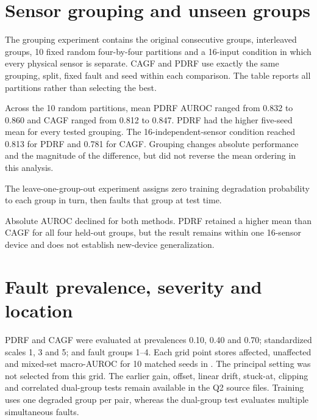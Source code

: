 \documentclass[10pt]{article}
\begin{document}
\section{Sensor grouping and unseen groups}

The grouping experiment contains the original consecutive groups, interleaved groups, 10 fixed random four-by-four partitions and a 16-input condition in which every physical sensor is separate. CAGF and PDRF use exactly the same grouping, split, fixed fault and seed within each comparison. The table reports all partitions rather than selecting the best.

\begin{table}[p]
\centering
\caption{Complete grouping distribution. PDRF wins count paired seed differences within a grouping.}
\resizebox{0.90\textwidth}{!}{}
\end{table}

Across the 10 random partitions, mean PDRF AUROC ranged from 0.832 to 0.860 and CAGF ranged from 0.812 to 0.847. PDRF had the higher five-seed mean for every tested grouping. The 16-independent-sensor condition reached 0.813 for PDRF and 0.781 for CAGF. Grouping changes absolute performance and the magnitude of the difference, but did not reverse the mean ordering in this analysis.

The leave-one-group-out experiment assigns zero training degradation probability to each group in turn, then faults that group at test time.

\begin{table}[ht]
\centering
\caption{Leave-one-group-out degradation training. Values are means across five seeds.}
\resizebox{0.65\textwidth}{!}{}
\end{table}

Absolute AUROC declined for both methods. PDRF retained a higher mean than CAGF for all four held-out groups, but the result remains within one 16-sensor device and does not establish new-device generalization.

\section{Fault prevalence, severity and location}

PDRF and CAGF were evaluated at prevalences 0.10, 0.40 and 0.70; standardized scales 1, 3 and 5; and fault groups 1--4. Each grid point stores affected, unaffected and mixed-set macro-AUROC for 10 matched seeds in . The principal setting was not selected from this grid. The earlier gain, offset, linear drift, stuck-at, clipping and correlated dual-group tests remain available in the Q2 source files. Training uses one degraded group per pair, whereas the dual-group test evaluates multiple simultaneous faults.
\end{document}
